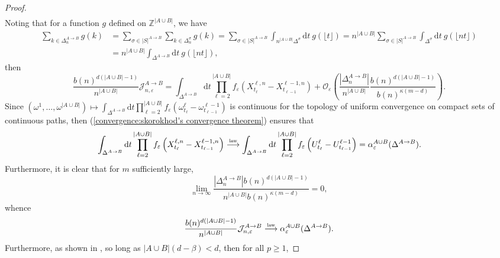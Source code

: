 \documentclass[10pt,a4paper]{amsart}
\newcommand{\1}{\mathds{1}}
\newcommand{\ZZ}{\mathbb Z}
\renewcommand{\d}{\mathrm d}
\newcommand{\distribution}{\stackrel{\scaleto{\mathrm{law}}{4pt}}{\longrightarrow}}
\numberwithin{equation}{section}
\begin{document}
\begin{proof}
\begin{align*}
    \end{align*}
    Noting that for a function $g$ defined on $\ZZ^{|A\cup B|}$, we have 
    \begin{align*}
        \sum_{k\in\Delta_n^{A\rightarrow B}}g(k)&=\sum_{\sigma\in|S|^{A\rightarrow B}}\sum_{k\in\Delta_n^\sigma}g(k)=\sum_{\sigma\in|S|^{A\rightarrow B}}\int_{n^{|A\cup B|}\Delta^\sigma}\d t\ g(\lfloor t\rfloor)=n^{|A\cup B|}\sum_{\sigma\in|S|^{A\rightarrow B}}\int_{\Delta^\sigma}\d t\ g(\lfloor nt\rfloor)\\
        &=n^{|A\cup B|}\int_{\Delta^{A\rightarrow B}}\d t\ g(\lfloor nt\rfloor),
    \end{align*}
    then
    \begin{equation*}
        \frac{b(n)^{d(|A\cup B|-1)}}{n^{|A\cup B|}}\mathcal J_{n,\varepsilon}^{A\rightarrow B}=\int_{\Delta^{A\rightarrow B}}\d t\prod_{\ell=2}^{|A\cup B|}f_\varepsilon\left(X_{t_\ell}^{\ell,n}-X_{t_{\ell-1}}^{\ell-1,n}\right)+\mathcal O_\varepsilon\left(\frac{|\Delta_n^{A\rightarrow B}|}{n^{|A\cup B|}}\frac{b(n)^{d(|A\cup B|-1)}}{b(n)^{\kappa(m-d)}}\right).
    \end{equation*}
    Since $(\omega^1,\dots,\omega^{|A\cup B|})\mapsto\int_{\Delta^{A\rightarrow B}}\d t\prod_{\ell=2}^{|A\cup B|}f_\varepsilon\left(\omega_{t_\ell}^\ell-\omega_{t_{\ell-1}}^{\ell-1}\right)$ is continuous for the topology of uniform convergence on compact sets of continuous paths, then (\ref{convergence:skorokhod's convergence theorem}) ensures that 
    \begin{equation*}
        \int_{\Delta^{A\rightarrow B}}\d t\prod_{\ell=2}^{|A\cup B|}f_\varepsilon\left(X_{t_\ell}^{\ell,n}-X_{t_{\ell-1}}^{\ell-1,n}\right)\distribution\int_{\Delta^{A\rightarrow B}}\d t\prod_{\ell=2}^{|A\cup B|}f_\varepsilon\left(U_{t_\ell}^\ell-U_{t_{\ell-1}}^{\ell-1}\right)=\alpha_\varepsilon^{A\cup B}(\Delta^{A\rightarrow B}).
    \end{equation*}
    Furthermore, it is clear that for $m$ sufficiently large, 
    \begin{equation*}
        \underset{n\rightarrow \infty}\lim\frac{|\Delta_n^{A\rightarrow B}|b(n)^{d(|A\cup B|-1)}}{n^{|A\cup B|}b(n)^{\kappa(m-d)}}=0,
    \end{equation*}
    whence 
    \begin{equation*}
        \frac{b(n)^{d(|A\cup B|-1)}}{n^{|A\cup B|}}\mathcal J_{n,\varepsilon}^{A\rightarrow B}\distribution\alpha_\varepsilon^{A\cup B}(\Delta^{A\rightarrow B}).
    \end{equation*}
    Furthermore, as shown in \cite{ChenRosen2005}, so long as $|A\cup B|(d-\beta)<d$, then for all $p\ge1$,

\end{proof}
\end{document}
